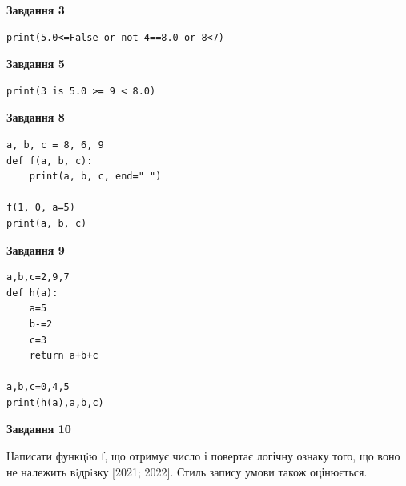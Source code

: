 \documentclass[12pt, ukrainian]{article}
\begin{document}
{\begin {large}
\begin{minipage}[t]{7.5cm}
\end{minipage}
\vline \hspace{6mm}
\begin{minipage}[t]{10.5cm}

\begin{center}
\textbf{Завдання 3}
\end{center}

\begin{verbatim}
print(5.0<=False or not 4==8.0 or 8<7)
\end{verbatim}



\begin{center}
\textbf{Завдання 5}
\end{center}

\begin{verbatim}
print(3 is 5.0 >= 9 < 8.0)
\end{verbatim}



\begin{center}
\textbf{Завдання 8}
\end{center}

\begin{verbatim}
a, b, c = 8, 6, 9
def f(a, b, c):
    print(a, b, c, end=" ")

f(1, 0, a=5)
print(a, b, c)
\end{verbatim}



\begin{center}
\textbf{Завдання 9}
\end{center}

\begin{verbatim}
a,b,c=2,9,7
def h(a):
    a=5
    b-=2
    c=3
    return a+b+c

a,b,c=0,4,5
print(h(a),a,b,c)
\end{verbatim}



\begin{center}
\textbf{Завдання 10}
\end{center}

Написати функцiю f, що отримує число і повертає логічну ознаку того, що воно не належить вiдрiзку [2021; 2022]. Стиль запису умови також оцінюється.\par

\end{minipage}

\end {large}}
\newpage
\end{document}
